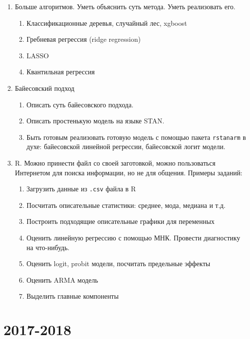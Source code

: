 \documentclass[12pt, a4paper]{article}\usepackage[]{graphicx}\usepackage[]{color}
\begin{document}
\begin{enumerate}
\item Больше алгоритмов. Уметь объяснить суть метода. Уметь реализовать его. %
\begin{enumerate}
\item Классификационные деревья, случайный лес, xgboost
\item Гребневая регрессия (ridge regression)
\item LASSO
\item Квантильная регрессия
\end{enumerate}

\item Байесовский подход
\begin{enumerate}
\item Описать суть байесовского подхода.
\item Описать простенькую модель на языке STAN.
\item Быть готовым реализовать готовую модель с помощью пакета \verb|rstanarm| в духе: байесовской линейной регрессии, байесовской логит модели.
\end{enumerate}

\item R. Можно принести файл со своей заготовкой, можно пользоваться Интернетом для поиска информации, но не для общения. Примеры заданий:
\begin{enumerate}
\item Загрузить данные из \verb|.csv| файла в R
\item Посчитать описательные статистики: среднее, мода, медиана и т.д.
\item Построить подходящие описательные графики для переменных
\item Оценить линейную регрессию с помощью МНК. Провести диагностику на что-нибудь.
\item Оценить logit, probit модели, посчитать предельные эффекты
\item Оценить ARMA модель
\item Выделить главные компоненты
\end{enumerate}


\end{enumerate}


\section{2017-2018}


\end{document}

